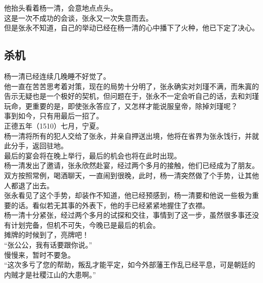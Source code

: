\begin{multicols}{\theparacolNo}
他抬头看着杨一清，会意地点点头。\\

这是一次不成功的会谈，张永又一次失意而去。\\

但是张永不知道，自己的举动已经在杨一清的心中播下了火种，他已下定了决心。\\

\subsection{杀机}
杨一清已经连续几晚睡不好觉了。\\

他一直在苦苦思考着对策，现在的局势十分明了，张永确实对刘瑾不满，而朱寘的告示无疑也是一个极好的契机，但问题在于，张永不一定会听自己的话，去和刘瑾玩命，更重要的是，即使张永答应了，又怎样才能说服皇帝，除掉刘瑾呢？\\

事到如今，只有用最后一招了。\\

正德五年（1510）七月，宁夏。\\

杨一清将所有的犯人交给了张永，并亲自押送出境，他将在省界为张永饯行，并就此分手，返回驻地。\\

最后的宴会将在晚上举行，最后的机会也将在此时出现。\\

杨一清发出了邀请，张永欣然赴宴，经过两个多月的接触，他们已经成为了朋友。\\

双方按照常例，喝酒聊天，一直闹到很晚，此时，杨一清突然做了个手势，让其他人都退了出去。\\

张永看见了这个手势，却装作不知道，他已经预感到，杨一清要和他说一些极为重要的话。看似若无其事的外表下，他的手已经紧紧地握住了衣襟。\\

杨一清十分紧张，经过两个多月的试探和交往，事情到了这一步，虽然很多事还没有计划完备，但机不可失，今晚已是最后的机会。\\

摊牌的时候到了，亮牌吧！\\

“张公公，我有话要跟你说。”\\

慢慢来，暂时不要急。\\

“这次多亏了您的帮助，叛乱才能平定，如今外部藩王作乱已经平息，可是朝廷的内贼才是社稷江山的大患啊。”\\


\end{multicols}
